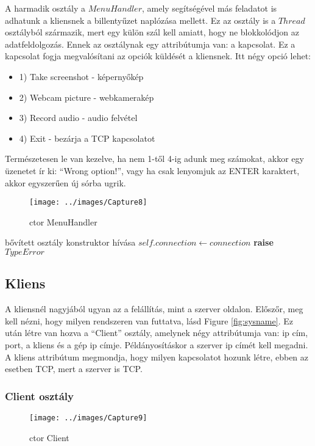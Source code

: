 \documentclass[a4paper, 11pt]{article}
\begin{document}
A harmadik osztály a $MenuHandler$, amely segítségével más feladatot is adhatunk a kliensnek a billentyűzet naplózása mellett. Ez az osztály is a $Thread$ osztályból származik, mert egy külön szál kell amiatt, hogy ne blokkolódjon az adatfeldolgozás. Ennek az osztálynak egy attribútumja van: a kapcsolat. Ez a kapcsolat fogja megvalósítani az opciók küldését a kliensnek. Itt négy opció lehet:
\begin{itemize}
\item 1) Take screenshot - képernyőkép
\item 2) Webcam picture - webkamerakép
\item 3) Record audio - audio felvétel
\item 4) Exit - bezárja a TCP kapcsolatot
\end{itemize}
Természetesen le van kezelve, ha nem 1-től 4-ig adunk meg számokat, akkor egy üzenetet ír ki: ``Wrong option!'', vagy ha csak lenyomjuk az ENTER karaktert, akkor egyszerűen új sórba ugrik.
\begin{figure}[H]
\centering
\texttt{[image: ../images/Capture8]}
\caption{ctor MenuHandler}
\label{fig:ctormenu}
\end{figure}

\begin{algorithmic}[H]
	\State bővített osztály konstruktor hívása
		\State $self.connection \gets connection$
	\Else
		\State \textbf{raise} $TypeError$
	\EndIf
\EndFunction
\end{algorithmic}

\subsection{Kliens}\label{subsec:client}
A kliensnél nagyjából ugyan az a felállítás, mint a szerver oldalon. Előszőr, meg kell nézni, hogy milyen rendszeren van futtatva, lásd Figure \ref{fig:sysname}. Ez után létre van hozva a ``Client'' osztály, amelynek négy attribútumja van: ip cím, port, a kliens és a gép ip címje. Példányosításkor a szerver ip címét kell megadni. A kliens attribútum megmondja, hogy milyen kapcsolatot hozunk létre, ebben az esetben TCP, mert a szerver is TCP.
\subsubsection{Client osztály}\label{subsubsec:clinetclass}
\begin{figure}[H]
\centering
\texttt{[image: ../images/Capture9]}
\caption{ctor Client}
\label{ctorclient}
\end{figure}
\end{document}
